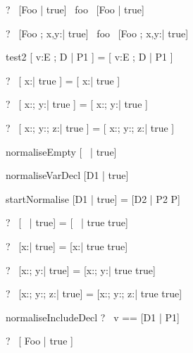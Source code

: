 \begin{zed}
  \vdash?~ [Foo | true] ~foo~ [Foo | true]
\end{zed}

\begin{zed}
  \vdash?~ [Foo ; x,y:\nat | true] ~foo~ [Foo ; x,y:\nat | true]
\end{zed}

\begin{zedrule}{test2}
  [ v:E ; D | P1 ] = [ v:E ; D | P1 ]
\end{zedrule}

\begin{zed}
  \vdash?~ [ x:\nat | true ] = [ x:\nat | true ]
\end{zed}

\begin{zed}
  \vdash?~ [ x:\nat; y:\nat | true ] = [ x:\nat; y:\nat | true ]
\end{zed}

\begin{zed}
  \vdash?~ [ x:\nat; y:\nat ; z:\nat | true ] =
           [ x:\nat; y:\nat ; z:\nat | true ]
\end{zed}



\begin{zedrule}{normaliseEmpty}
   [~ | true] \unfoldsTo [~ | true]
\end{zedrule}

\begin{zedrule}{normaliseVarDecl}
   [D1 | true] \unfoldsTo [D2 | P2]
\derives
   [v:E; D1 | true] \unfoldsTo [v:E; D2 | P2]
\end{zedrule}

\begin{zedrule}{startNormalise}
   [D1 | true] \unfoldsTo [D2 | P2]
\derives
   [D1 | P] = [D2 | P2 \land P]
\end{zedrule}

\begin{zed}
  \vdash?~ [~ | true] = [~ | true \land true]
\end{zed}

\begin{zed}
  \vdash?~ [x:\nat | true] = [x:\nat | true \land true]
\end{zed}

\begin{zed}
  \vdash?~ [x:\nat ; y:\nat | true] = [x:\nat ; y:\nat | true \land true]
\end{zed}

\begin{zed}
  \vdash?~ [x:\nat ; y:\nat ; z:\nat | true] =
           [x:\nat ; y:\nat ; z:\nat | true \land true]
\end{zed}



\begin{zedrule}{normaliseIncludeDecl}
   \proviso ?~ v == [D1 | P1] \\
\derives
   [v; D | true] \unfoldsTo [D1 | P1 \land P2]
\end{zedrule}

\begin{zed}
  \vdash?~ [ Foo | true ] 
\end{zed}
